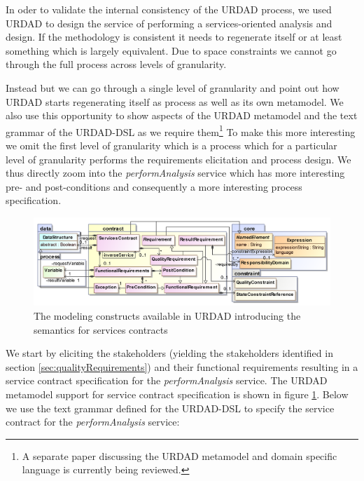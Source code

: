 In oder to validate the internal consistency of the URDAD process, we used URDAD to design the service of performing a services-oriented analysis and design. If the methodology is consistent it needs to regenerate itself or at least something which is largely equivalent. Due to space constraints we cannot go through the full process across levels of granularity. 

Instead but we can go through a single level of granularity and point out how URDAD starts regenerating itself as process as well as its own metamodel. We also use this opportunity to show aspects of the URDAD metamodel and the text grammar of the URDAD-DSL as we require them\footnote{A separate paper discussing the URDAD metamodel and domain specific language is currently being reviewed.} To make this more interesting we omit the first level of granularity which is a process which for a particular level of granularity performs the requirements elicitation and process design. We thus directly zoom into the \emph{performAnalysis} service which has more interesting pre- and post-conditions and consequently a more interesting process specification.

\begin{figure}[Htbp]
  \centering
  \includegraphics{contract}
  \caption{The modeling constructs available in URDAD introducing the semantics for services contracts}
  \label{fig:contractModule}
\end{figure}

We start by eliciting the stakeholders (yielding the stakeholders identified in section \ref{sec:qualityRequirements}) and their functional requirements resulting in a service contract specification for the \emph{performAnalysis} service. The URDAD metamodel support for service contract specification is shown in figure \ref{fig:contractModule}. Below we use the text grammar defined for the URDAD-DSL to specify the service contract for the \emph{performAnalysis} service:

